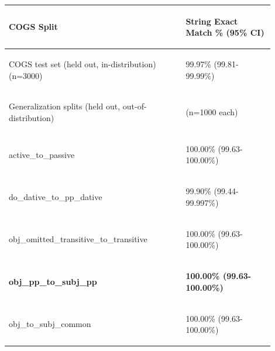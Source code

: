 \documentclass[11pt]{article}
\begin{document}
\begin{table}
\centering
\begin{tabular}{p{0.6\linewidth} p{0.3\linewidth}}
\hline
\begin{tiny}\textbf{COGS Split}\end{tiny} & \begin{tiny}\textbf{String Exact Match \% (95\% CI)}\end{tiny} \\
\hline
\begin{tiny}COGS test set (held out, in-distribution) (n=3000)\end{tiny} & \begin{tiny} 99.97\% (99.81-99.99\%)\end{tiny} \\
\hline
\begin{tiny}Generalization splits (held out, out-of-distribution) \end{tiny} & \begin{tiny} (n=1000 each) \end{tiny}  \\
\hline
\begin{tiny}active\_to\_passive\end{tiny} & \begin{tiny}100.00\% (99.63-100.00\%)\end{tiny} \\
\begin{tiny}do\_dative\_to\_pp\_dative\end{tiny} & \begin{tiny} 99.90\% (99.44-99.997\%)\end{tiny} \\
\begin{tiny}obj\_omitted\_transitive\_to\_transitive\end{tiny} & \begin{tiny} 100.00\% (99.63-100.00\%)\end{tiny} \\
\begin{tiny}\textbf{obj\_pp\_to\_subj\_pp}\end{tiny} & \begin{tiny}\textbf{ 100.00\% (99.63-100.00\%)}\end{tiny} \\
\begin{tiny}obj\_to\_subj\_common\end{tiny} & \begin{tiny} 100.00\% (99.63-100.00\%)\end{tiny} \\

\end{tabular}
\end{table}
\end{document}
